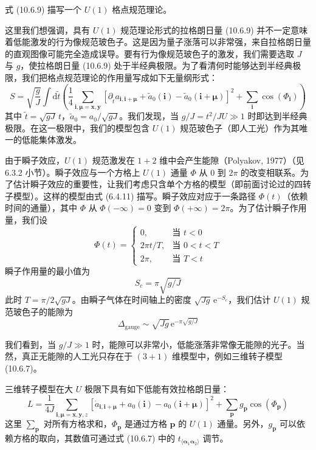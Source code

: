 式 (10.6.9) 描写一个 $U(1)$ 格点规范理论。

这里我们想强调，具有 $U(1)$ 规范理论形式的拉格朗日量 (10.6.9) 并不一定意味着低能激发的行为像规范玻色子。这是因为量子涨落可以非常强，来自拉格朗日量的直观图像可能完全造成误导。要有行为像规范玻色子的激发，我们需要选取 $J$ 与 $g$，使拉格朗日量 (10.6.9) 处于半经典极限。为了看清何时能够达到半经典极限，我们把格点规范理论的作用量写成如下无量纲形式：
\begin{equation*}
S=\sqrt{\frac{g}{J}}\int\mathrm{d}\tilde t\left(\frac{1}{4}\sum_{\pmb i,\pmb\mu=\pmb x,\pmb y}[\partial_{\tilde t}a_{\pmb i,\pmb i+\pmb\mu}+\tilde a_0(\pmb i)-\tilde a_0(\pmb i+\pmb\mu)]^{2}+\sum_{\pmb i}\cos(\Phi_{\pmb i})\right)
\end{equation*}
其中 $\tilde t=\sqrt{gJ}\,t$，$\tilde a_0=a_0/\sqrt{gJ}$。我们发现，当 $g/J=t^{2}/JU\gg1$ 时即达到半经典极限。在这一极限中，我们的模型包含 $U(1)$ 规范玻色子（即人工光）作为其唯一的低能集体激发。

由于瞬子效应，$U(1)$ 规范激发在 $1+2$ 维中会产生能隙（Polyakov, 1977）（见 6.3.2 小节）。瞬子效应与一个方格上 $U(1)$ 通量 $\Phi$ 从 0 到 $2\pi$ 的改变相联系。为了估计瞬子效应的重要性，让我们考虑只含单个方格的模型（即前面讨论过的四转子模型）。这样的模型由式 (6.4.11) 描写。瞬子效应对应于一条路径 $\Phi(t)$（依赖时间的通量），其中 $\Phi$ 从 $\Phi(-\infty)=0$ 变到 $\Phi(+\infty)=2\pi$。为了估计瞬子作用量，我们设
\begin{equation*}
\Phi(t)=\left\{\begin{array}{ll}0,&\text{当 } t<0\\ 2\pi t/T,&\text{当 } 0<t<T\\ 2\pi,&\text{当 } T<t\end{array}\right.
\end{equation*}
瞬子作用量的最小值为
\begin{equation*}
S_c=\pi\sqrt{g/J}
\end{equation*}
此时 $T=\pi/2\sqrt{gJ}$。由瞬子气体在时间轴上的密度 $\sqrt{Jg}\,\mathrm{e}^{-S_c}$，我们估计 $U(1)$ 规范玻色子的能隙为
\begin{equation*}
\Delta_{\mathrm{gauge}}\sim\sqrt{Jg}\,\mathrm{e}^{-\pi\sqrt{g/J}}\tag{10.6.10}
\end{equation*}

我们看到，当 $g/J\gg1$ 时，能隙可以非常小，低能涨落非常像无能隙的光子。当然，真正无能隙的人工光只存在于 $(3+1)$ 维模型中，例如三维转子模型 (10.6.7)。

三维转子模型在大 $U$ 极限下具有如下低能有效拉格朗日量：
\begin{equation*}
L=\frac{1}{4J}\sum_{\pmb i,\pmb\mu=\pmb x,\pmb y,z}[\dot{a}_{\pmb i,\pmb i+\pmb\mu}+a_0(\pmb i)-a_0(\pmb i+\pmb\mu)]^{2}+\sum_{\pmb p}g_{\pmb p}\cos(\Phi_{\pmb p})\tag{10.6.11}
\end{equation*}
这里 $\sum_{\pmb p}$ 对所有方格求和，$\Phi_{\pmb p}$ 是通过方格 $\pmb p$ 的 $U(1)$ 通量。另外，$g_{\pmb p}$ 可以依赖方格的取向，其数值可通过式 (10.6.7) 中的 $t_{\langle\pmb\alpha_1\pmb\alpha_2\rangle}$ 调节。

